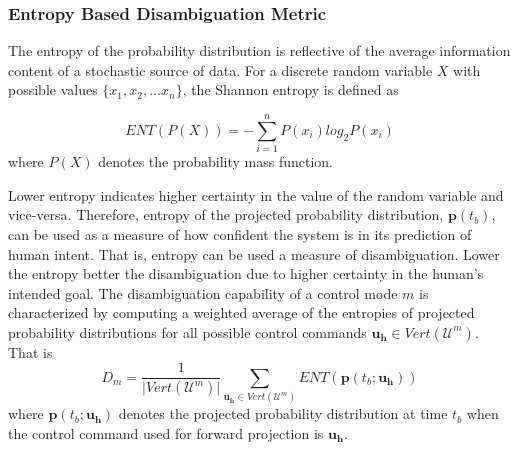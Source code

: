 \documentclass[conference]{IEEEtran}
\begin{document}
\subsubsection{Entropy Based Disambiguation Metric}\label{sssec:ent}
The entropy of the probability distribution is reflective of the average information content of a stochastic source of data. For a discrete random variable $X$ with possible values $\{x_1, x_2,\dots x_n\}$, the Shannon entropy is defined as 

\begin{equation*}
ENT(P(X)) = -\sum_{i = 1}^{n} P(x_i)log_{2}P(x_i)
\end{equation*}
where $P(X)$ denotes the probability mass function.

Lower entropy indicates higher certainty in the value of the random variable and vice-versa. Therefore, entropy of the projected probability distribution, $\boldsymbol{p}(t_b)$, can be used as a measure of how confident the system is in its prediction of human intent. That is, entropy can be used a measure of disambiguation. Lower the entropy better the disambiguation due to higher certainty in the human's intended goal. The disambiguation capability of a control mode $m$ is characterized by computing a weighted average of the entropies of projected probability distributions for all possible control commands $\boldsymbol{u_h} \in Vert(\mathcal{U}^m)$. That is
\begin{equation}
D_m = \frac{1}{\vert Vert(\mathcal{U}^m) \vert}\sum_{\boldsymbol{u_h} \in Vert(\mathcal{U}^m)}  ENT(\boldsymbol{p}(t_b; \boldsymbol{u_h}))
\end{equation}
where $\boldsymbol{p}(t_b; \boldsymbol{u_h})$ denotes the projected probability distribution at time $t_b$ when the control command used for forward projection is $\boldsymbol{u_h}$.
\end{document}
